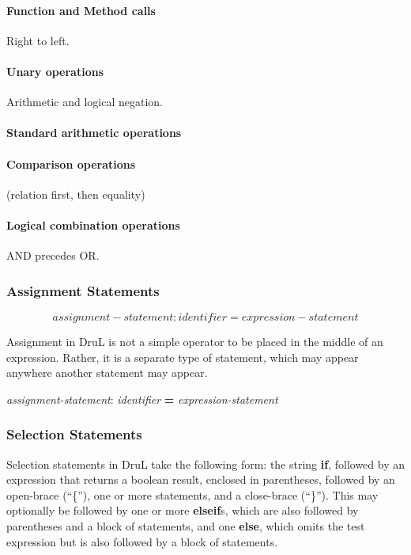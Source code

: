 \documentclass[11pt,twoside]{article}
\begin{document}
\paragraph{Function and Method calls}
Right to left.

\paragraph{Unary operations}
Arithmetic and logical negation.

\paragraph{Standard arithmetic operations}

\paragraph{Comparison operations}

(relation first, then equality)

\paragraph{Logical combination operations}

AND precedes OR.

\subsubsection{Assignment Statements}

\[ assignment-statement: identifier \mathbf{=} expression-statement \]

Assignment in DruL is not a simple operator to be placed in the middle of an expression.  Rather, it is a separate type of statement, which may appear anywhere another statement may appear.  

\emph{assignment-statement}: \emph{identifier} \textbf{=}  \emph{expression-statement}

\subsubsection{Selection Statements}

Selection statements in DruL take the following form: the string \textbf{if}, followed by an expression that returns a boolean result, enclosed in parentheses, followed by an open-brace (``\{''), one or more statements, and a close-brace (``\}'').  This may optionally be followed by one or more \textbf{elseif}s, which are also followed by parentheses and a block of statements, and one \textbf{else}, which omits the test expression but is also followed by a block of statements.
\end{document}
